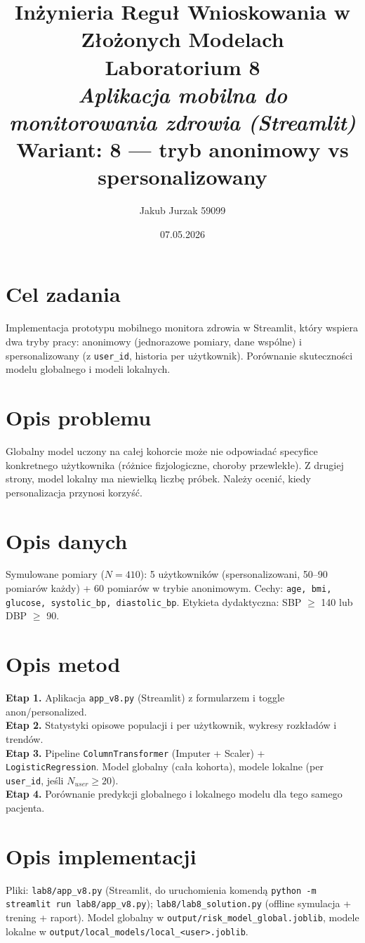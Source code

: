 \documentclass[12pt,a4paper]{article}
\title{
  \vspace{2cm}
  \LARGE\textbf{Inżynieria Reguł Wnioskowania w Złożonych Modelach}\\[0.6cm]
  \Large Laboratorium 8\\[0.4cm]
  \large \textit{Aplikacja mobilna do monitorowania zdrowia (Streamlit)}\\[0.3cm]
  \normalsize Wariant: \textbf{8 — tryb anonimowy vs spersonalizowany}
}
\author{Jakub Jurzak 59099}
\date{07.05.2026}
\begin{document}
\maketitle
\thispagestyle{empty}
\newpage

\tableofcontents
\newpage

\section{Cel zadania}
Implementacja prototypu mobilnego monitora zdrowia w Streamlit, który wspiera dwa tryby pracy: anonimowy (jednorazowe pomiary, dane wspólne) i spersonalizowany (z \texttt{user\_id}, historia per użytkownik). Porównanie skuteczności modelu globalnego i modeli lokalnych.

\section{Opis problemu}
Globalny model uczony na całej kohorcie może nie odpowiadać specyfice konkretnego użytkownika (różnice fizjologiczne, choroby przewlekłe). Z drugiej strony, model lokalny ma niewielką liczbę próbek. Należy ocenić, kiedy personalizacja przynosi korzyść.

\section{Opis danych}
Symulowane pomiary ($N=410$): 5 użytkowników (spersonalizowani, 50--90 pomiarów każdy) + 60 pomiarów w trybie anonimowym. Cechy: \texttt{age, bmi, glucose, systolic\_bp, diastolic\_bp}. Etykieta dydaktyczna: SBP $\ge$ 140 lub DBP $\ge$ 90.

\section{Opis metod}
\textbf{Etap 1.} Aplikacja \texttt{app\_v8.py} (Streamlit) z formularzem i toggle anon/personalized.\\\textbf{Etap 2.} Statystyki opisowe populacji i per użytkownik, wykresy rozkładów i trendów.\\\textbf{Etap 3.} Pipeline \texttt{ColumnTransformer} (Imputer + Scaler) + \texttt{LogisticRegression}. Model globalny (cała kohorta), modele lokalne (per \texttt{user\_id}, jeśli $N_{user} \ge 20$).\\\textbf{Etap 4.} Porównanie predykcji globalnego i lokalnego modelu dla tego samego pacjenta.

\section{Opis implementacji}
Pliki: \texttt{lab8/app\_v8.py} (Streamlit, do uruchomienia komendą \texttt{python -m streamlit run lab8/app\_v8.py}); \texttt{lab8/lab8\_solution.py} (offline symulacja + trening + raport). Model globalny w \texttt{output/risk\_model\_global.joblib}, modele lokalne w \texttt{output/local\_models/local\_<user>.joblib}.
\end{document}
